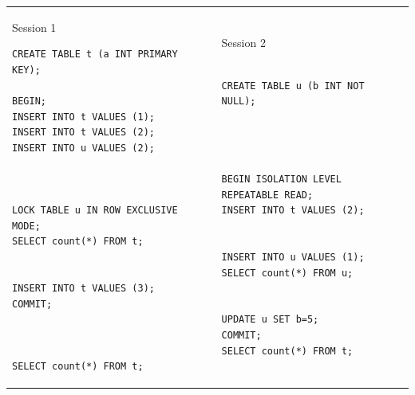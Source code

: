 \documentclass[10pt]{article}
\theoremstyle{definition}
\begin{document}
\begin{tcolorbox}
\begin{tabular}{p{3.25in}p{3in}}
\hspace{-0.2in}Session 1
\begin{lstlisting}
CREATE TABLE t (a INT PRIMARY KEY);

BEGIN;
INSERT INTO t VALUES (1);
INSERT INTO t VALUES (2);
INSERT INTO u VALUES (2);



LOCK TABLE u IN ROW EXCLUSIVE MODE;
SELECT count(*) FROM t;


INSERT INTO t VALUES (3);
COMMIT;



SELECT count(*) FROM t;
\end{lstlisting}
    &
\hspace{-0.2in}Session 2
\begin{lstlisting}

CREATE TABLE u (b INT NOT NULL);




BEGIN ISOLATION LEVEL
REPEATABLE READ;
INSERT INTO t VALUES (2);


INSERT INTO u VALUES (1);
SELECT count(*) FROM u;


UPDATE u SET b=5;
COMMIT;
SELECT count(*) FROM t;

\end{lstlisting}
\end{tabular}
\vspace{-0.2in}
\end{tcolorbox}
\vspace{0.25in}
\end{document}
